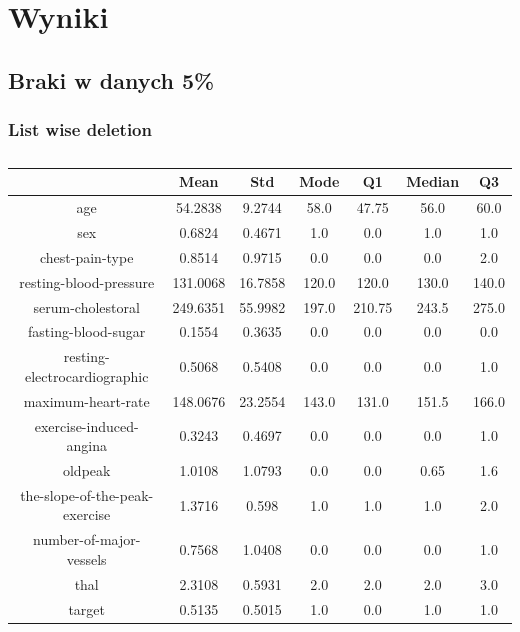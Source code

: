 \documentclass{classrep}
\begin{document}
    \section{Wyniki}
    \label{results} {

        \subsection{Braki w danych 5\%}
        \label{results:5-percent} {

            \subsubsection{List wise deletion}
            \label{results:5-percent:list-wise} {

                \begin{table}[!htbp]
                    \centering
                    \begin{tabular}{|c|c|c|c|c|c|c|}
                        \hline
                        & Mean & Std & Mode & Q1 & Median & Q3 \\ \hline
                        age & 54.2838 & 9.2744 & 58.0 & 47.75 & 56.0 & 60.0 \\ \hline
                        sex & 0.6824 & 0.4671 & 1.0 & 0.0 & 1.0 & 1.0 \\ \hline
                        chest-pain-type & 0.8514 & 0.9715 & 0.0 & 0.0 & 0.0 & 2.0 \\ \hline
                        resting-blood-pressure & 131.0068 & 16.7858 & 120.0 & 120.0 & 130.0 & 140.0 \\ \hline
                        serum-cholestoral & 249.6351 & 55.9982 & 197.0 & 210.75 & 243.5 & 275.0 \\ \hline
                        fasting-blood-sugar & 0.1554 & 0.3635 & 0.0 & 0.0 & 0.0 & 0.0 \\ \hline
                        resting-electrocardiographic & 0.5068 & 0.5408 & 0.0 & 0.0 & 0.0 & 1.0 \\ \hline
                        maximum-heart-rate & 148.0676 & 23.2554 & 143.0 & 131.0 & 151.5 & 166.0 \\ \hline
                        exercise-induced-angina & 0.3243 & 0.4697 & 0.0 & 0.0 & 0.0 & 1.0 \\ \hline
                        oldpeak & 1.0108 & 1.0793 & 0.0 & 0.0 & 0.65 & 1.6 \\ \hline
                        the-slope-of-the-peak-exercise & 1.3716 & 0.598 & 1.0 & 1.0 & 1.0 & 2.0 \\ \hline
                        number-of-major-vessels & 0.7568 & 1.0408 & 0.0 & 0.0 & 0.0 & 1.0 \\ \hline
                        thal & 2.3108 & 0.5931 & 2.0 & 2.0 & 2.0 & 3.0 \\ \hline
                        target & 0.5135 & 0.5015 & 1.0 & 0.0 & 1.0 & 1.0 \\ \hline
                    \end{tabular}
                    \caption{}
                    \label{result_5_List-wise-deletion}
                \end{table}
                \FloatBarrier

}}}
\end{document}
